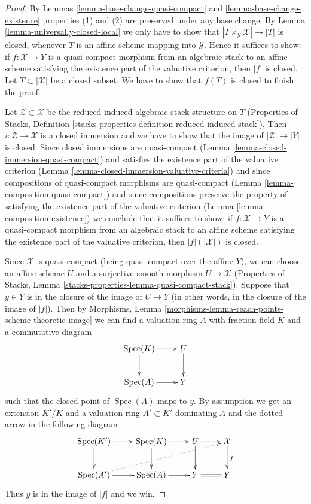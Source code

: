 \documentclass[10pt,a4paper]{amsart}
\theoremstyle{plain}
\theoremstyle{definition}
\theoremstyle{remark}
\numberwithin{equation}{subsection}
\def\Spec{\mathop{\mathrm{Spec}}}
\begin{document}
\begin{proof}
By Lemmas \ref{lemma-base-change-quasi-compact}
and \ref{lemma-base-change-existence}
properties (1) and (2) are preserved under
any base change. By Lemma \ref{lemma-universally-closed-local}
we only have to show that $|T \times_\mathcal{Y} \mathcal{X}| \to |T|$
is closed, whenever $T$ is an affine scheme mapping into $\mathcal{Y}$.
Hence it suffices to show: if $f : \mathcal{X} \to Y$ is a
quasi-compact morphism from an algebraic stack to an affine scheme
satisfying the existence part of the valuative criterion,
then $|f|$ is closed. Let $T \subset |\mathcal{X}|$ be a closed subset.
We have to show that $f(T)$ is closed to finish the proof.

\medskip\noindent
Let $\mathcal{Z} \subset \mathcal{X}$ be the reduced induced
algebraic stack structure on $T$ (Properties of Stacks,
Definition \ref{stacks-properties-definition-reduced-induced-stack}).
Then $i : \mathcal{Z} \to \mathcal{X}$ is a closed immersion
and we have to show that the image of $|\mathcal{Z}| \to |Y|$
is closed. Since closed immersions are quasi-compact
(Lemma \ref{lemma-closed-immersion-quasi-compact})
and satisfies the existence part of the valuative criterion
(Lemma \ref{lemma-closed-immersion-valuative-criteria})
and since compositions of quasi-compact morphisms are quasi-compact
(Lemma \ref{lemma-composition-quasi-compact})
and since compositions preserve the property of satisfying
the existence part of the valuative criterion
(Lemma \ref{lemma-composition-existence})
we conclude that it suffices to show: if $f : \mathcal{X} \to Y$
is a quasi-compact morphism from an algebraic stack to an affine scheme
satisfying the existence part of the valuative criterion,
then $|f|(|\mathcal{X}|)$ is closed.

\medskip\noindent
Since $\mathcal{X}$ is quasi-compact (being quasi-compact over the
affine $Y$), we can choose an affine scheme $U$ and a surjective
smooth morphism $U \to \mathcal{X}$
(Properties of Stacks, Lemma
\ref{stacks-properties-lemma-quasi-compact-stack}).
Suppose that $y \in Y$ is in the closure of the image of $U \to Y$
(in other words, in the closure of the image of $|f|$).
Then by
Morphisms, Lemma \ref{morphisms-lemma-reach-points-scheme-theoretic-image}
we can find a valuation ring $A$ with fraction field $K$
and a commutative diagram
$$
\xymatrix{
\Spec(K) \ar[r] \ar[d] & U \ar[d] \\
\Spec(A) \ar[r] & Y
}
$$
such that the closed point of $\Spec(A)$ maps to $y$. By assumption
we get an extension $K'/K$ and a valuation ring $A' \subset K'$
dominating $A$ and the dotted arrow in the following diagram
$$
\xymatrix{
\Spec(K') \ar[r] \ar[d] &
\Spec(K) \ar[r] \ar[d] &
U \ar[d] \ar[r] &
\mathcal{X} \ar[d]^f \\
\Spec(A') \ar[r] \ar@{..>}[rrru] &
\Spec(A) \ar[r] &
Y  \ar@{=}[r] &
Y
}
$$
Thus $y$ is in the image of $|f|$ and we win.
\end{proof}
\end{document}
